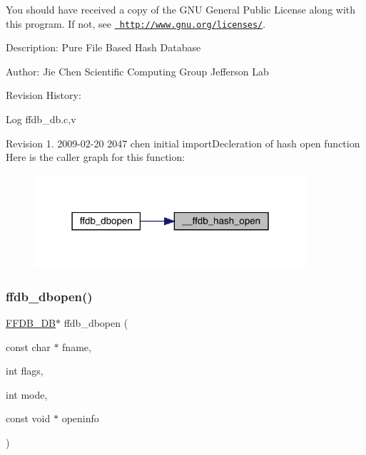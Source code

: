 You should have received a copy of the G\+NU General Public License along with this program. If not, see \href{http://www.gnu.org/licenses/}{\texttt{ http\+://www.\+gnu.\+org/licenses/}}. 

 Description\+: Pure File Based Hash Database

Author\+: Jie Chen Scientific Computing Group Jefferson Lab

Revision History\+: \begin{DoxyParagraph}{Log}
ffdb\+\_\+db.\+c,v 
\end{DoxyParagraph}
Revision 1. 2009-\/02-\/20 2047 chen initial import\+Decleration of hash open function Here is the caller graph for this function\+:
\nopagebreak
\begin{figure}[H]
\begin{center}
\leavevmode
\includegraphics[width=286pt]{d6/dea/adat-devel_2other__libs_2filedb_2filehash_2ffdb__db_8c_a415affcc4f0854dfe569ac4c43a72e7f_icgraph}
\end{center}
\end{figure}
\mbox{\label{adat-devel_2other__libs_2filedb_2filehash_2ffdb__db_8c_a956b24369a3231de1bee8bc33cae46e0}} 
\subsubsection{\texorpdfstring{ffdb\_dbopen()}{ffdb\_dbopen()}}
{\footnotesize\ttfamily \mbox{\hyperlink{adat-devel_2other__libs_2filedb_2filehash_2ffdb__db_8h_a0b27b956926453a7a8141ea8e10f0df8}{F\+F\+D\+B\+\_\+\+DB}}$\ast$ ffdb\+\_\+dbopen (\begin{DoxyParamCaption}\item[{const char $\ast$}]{fname,  }\item[{int}]{flags,  }\item[{int}]{mode,  }\item[{const void $\ast$}]{openinfo }\end{DoxyParamCaption})}


